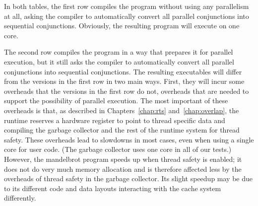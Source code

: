 In both tables, the first row
compiles the program without using any parallelism at all,
asking the compiler to automatically convert
all parallel conjunctions into sequential conjunctions.
Obviously, the resulting program will execute on one core.

The second row
compiles the program in a way that prepares it for parallel execution,
but it still asks the compiler to automatically convert
all parallel conjunctions into sequential conjunctions.
The resulting executables will differ from the versions in the first row
in two main ways.
First, they will incur some overheads
that the versions in the first row do not,
overheads that are needed to support the possibility of parallel execution.
The most important of these overheads is that,
as described in Chapters~\ref{chap:rts} and~\ref{chap:overlap},
the runtime reserves a hardware register to point to thread specific data and
compiling
the garbage collector and the rest of the runtime system for thread safety.
These overheads lead to slowdowns in most cases,
even when using a single core for user code.
(The garbage collector uses one core in all of our tests.)
However, the mandelbrot program speeds up when thread safety is enabled;
it does not do very much memory allocation
and is therefore affected less by
the overheads of thread safety in the garbage collector.
Its slight speedup may be due to
its different code and data layouts
interacting with the cache system differently.

